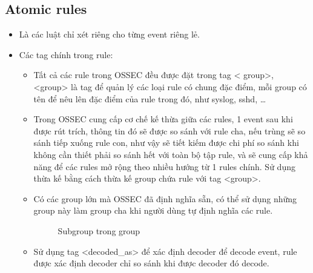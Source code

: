   \subsection{Atomic rules}
  \begin{itemize}
    \item Là các luật chỉ xét riêng cho từng event riêng lẻ.
    \item Các tag chính trong rule:
    \begin{itemize}
      \item Tất cả các rule trong OSSEC đều được đặt trong tag \textless
      group\textgreater, \textless group\textgreater{} là tag để quản lý các
      loại rule có chung đặc điểm, mỗi group có tên để nêu lên đặc điểm của rule trong đó, như syslog, sshd, \dots
      \item Trong OSSEC cung cấp cơ chế kế thừa giữa các rules, 1 event sau khi
      được rút trích, thông tin đó sẽ được so sánh với rule cha, nếu trùng sẽ so
      sánh tiếp xuống rule con, như vậy sẽ tiết kiếm được chi phí so sánh khi
      không cần thiết phải so sánh hết với toàn bộ tập rule, và sẽ cung cấp khả
      năng để các rules mở rộng theo nhiều hướng từ 1 rules chính. Sử dụng thừa
      kế bằng cách thừa kế group chứa rule với tag \textless group\textgreater.
      \item Có các group lớn mà OSSEC đã định nghĩa sẵn, có thể sử dụng những
      group này làm group cha khi người dùng tự định nghĩa các rule.
      \begin{figure}[h!]
	\centering 
{}
	\caption{Subgroup trong group}
  \end{figure}
      \item Sử dụng tag \textless decoded\_as\textgreater{}  để xác định decoder
      để decode event, rule được xác định decoder chỉ so sánh khi được decoder đó decode.

\end{itemize}
\end{itemize}
